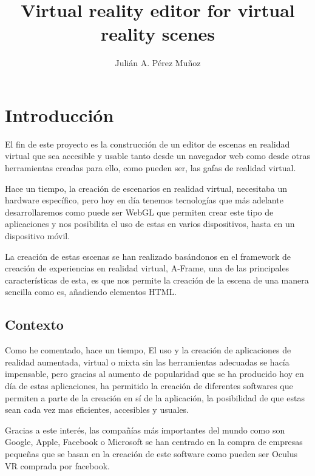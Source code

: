 \documentclass[a4paper, 12pt]{book}
\title{Virtual reality editor for virtual reality scenes}
\author{Julián A. Pérez Muñoz}
\begin{document}
\renewcommand{\refname}{Bibliografía}  %
\renewcommand{\appendixname}{Apéndice}

\cleardoublepage



\cleardoublepage
\chapter{Introducción}
\label{sec:intro} %

El fin de este proyecto es la construcción de un editor de escenas en realidad virtual que sea accesible y usable tanto desde un navegador web como desde otras herramientas creadas para ello, como pueden ser, las gafas de realidad virtual.

Hace un tiempo, la creación de escenarios en realidad virtual, necesitaba un hardware específico, pero hoy en día tenemos tecnologías que más adelante desarrollaremos como puede ser WebGL que permiten crear este tipo de aplicaciones y nos posibilita el uso de estas en varios dispositivos, hasta en un dispositivo móvil.

La creación de estas escenas se han realizado basándonos en el framework de creación de experiencias en realidad virtual, A-Frame, una de las principales características de esta, es que nos permite la creación de la escena de una manera sencilla como es, añadiendo elementos HTML. 

\section{Contexto}
\label{sec:contexto}

Como he comentado, hace un tiempo, El uso y la creación de aplicaciones de realidad aumentada, virtual o mixta sin las herramientas adecuadas se hacía impensable, pero gracias al aumento de popularidad que se ha producido hoy en día de estas aplicaciones, ha permitido la creación de diferentes softwares que permiten a parte de la creación en sí de la aplicación, la posibilidad de que estas sean cada vez mas eficientes, accesibles y usuales.

Gracias a este interés, las compañías más importantes del mundo como son Google, Apple, Facebook o Microsoft se han centrado en la compra de empresas pequeñas que se basan en la creación de este software como pueden ser Oculus VR comprada por facebook. 
\end{document}
